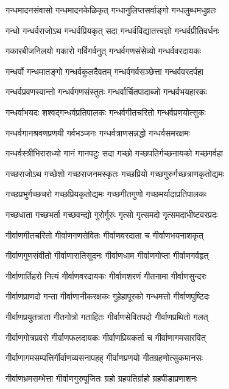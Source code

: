 \twolineshloka
{गन्धमादनसंवासो गन्धमादनकेळिकृत्}%
{गन्धानुलिप्तसर्वाङ्गो गन्धलुब्धमधुव्रतः}%

\twolineshloka
{गन्धो गन्धर्वराजोऽथ गन्धर्वप्रियकृत् सदा}%
{गन्धर्वविद्यातत्त्वज्ञो गन्धर्वप्रीतिवर्धनः}%

\twolineshloka
{गकारबीजनिलयो गकारो गर्विगर्वनुत्}%
{गन्धर्वगणसंसेव्यो गन्धर्ववरदायकः}%

\twolineshloka
{गन्धर्वो गन्धमातङ्गो गन्धर्वकुलदैवतम्}%
{गन्धर्वगर्वसञ्छेत्ता गन्धर्ववरदर्पहा}%

\twolineshloka
{गन्धर्वप्रवणस्वान्तो गन्धर्वगणसंस्तुतः}%
{गन्धर्वार्चितपादाब्जो गन्धर्वभयहारकः}%

\twolineshloka
{गन्धर्वाभयदः शश्वद्गन्धर्वप्रतिपालकः}%
{गन्धर्वगीतचरितो गन्धर्वप्रणयोत्सुकः}%

\twolineshloka
{गन्धर्वगानश्रवणप्रणयी गर्वभञ्जनः}%
{गन्धर्वत्राणसन्नद्धो गन्धर्वसमरक्षमः}%

\twolineshloka
{गन्धर्वस्त्रीभिराराध्यो गानं गानपटुः सदा}%
{गच्छो गच्छपतिर्गच्छनायको गच्छगर्वहा}%

\twolineshloka
{गच्छराजोऽथ गच्छेशो गच्छराजनमस्कृतः}%
{गच्छप्रियो गच्छगुरुर्गच्छत्राणकृतोद्यमः}%

\twolineshloka
{गच्छप्रभुर्गच्छचरो गच्छप्रियकृतोद्यमः}%
{गच्छगीतगुणो गच्छमर्यादाप्रतिपालकः}%

\twolineshloka
{गच्छधाता गच्छभर्ता गच्छवन्द्यो गुरोर्गुरुः}%
{गृत्सो गृत्समदो गृत्समदाभीष्टवरप्रदः}%

\twolineshloka
{गीर्वाणगीतचरितो गीर्वाणगणसेवितः}%
{गीर्वाणवरदाता च गीर्वाणभयनाशकृत्}%

\twolineshloka
{गीर्वाणगुणसंवीतो गीर्वाणारातिसूदनः}%
{गीर्वाणधाम गीर्वाणगोप्ता गीर्वाणगर्वहृत्}%

\twolineshloka
{गीर्वाणार्तिहरो नित्यं गीर्वाणवरदायकः}%
{गीर्वाणशरणं गीतनामा गीर्वाणसुन्दरः}%

\twolineshloka
{गीर्वाणप्राणदो गन्ता गीर्वाणानीकरक्षकः}%
{गुहेहापूरको गन्धमत्तो गीर्वाणपुष्टिदः}%

\twolineshloka
{गीर्वाणप्रयुतत्राता गीतगोत्रो गताहितः}%
{गीर्वाणसेवितपदो गीर्वाणप्रथितो गलत्}%

\twolineshloka
{गीर्वाणगोत्रप्रवरो गीर्वाणफलदायकः}%
{गीर्वाणप्रियकर्ता च गीर्वाणागमसारवित्}%

\twolineshloka
{गीर्वाणागमसम्पत्तिर्गीर्वाणव्यसनापहह्}%
{गीर्वाणप्रणयो गीतग्रहणोत्सुकमानसः}%

\twolineshloka
{गीर्वाणभ्रमसम्भेत्ता गीर्वाणगुरुपूजितः}%
{ग्रहो ग्रहपतिर्ग्राहो ग्रहपीडाप्रणाशनः}%

